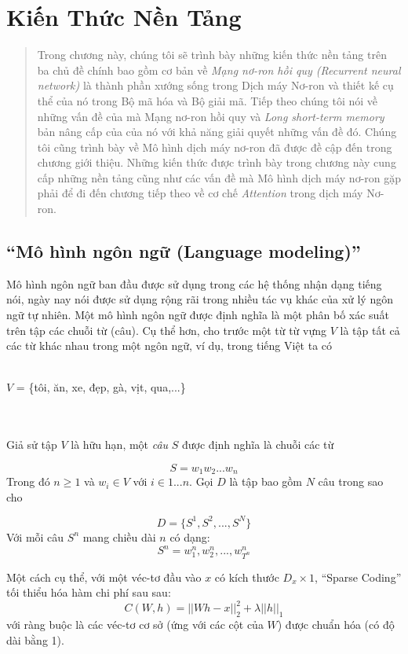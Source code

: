 \chapter{Kiến Thức Nền Tảng}
\ifpdf
    \graphicspath{{Chapter2/Chapter2Figs/PNG/}{Chapter2/Chapter2Figs/PDF/}{Chapter2/Chapter2Figs/}}
\else
    \graphicspath{{Chapter2/Chapter2Figs/EPS/}{Chapter2/Chapter2Figs/}}
\fi

\begin{quote}

Trong chương này, chúng tôi sẽ trình bày những kiến thức nền tảng trên ba chủ đề chính bao gồm cơ bản về \textit{Mạng nơ-ron hồi quy (Recurrent neural network)} là thành phần xướng sống trong Dịch máy Nơ-ron và thiết kế cụ thể của nó trong Bộ mã hóa và Bộ giải mã. Tiếp theo chúng tôi nói về những vấn đề của mà Mạng nơ-ron hồi quy và \textit{Long short-term memory} bản nâng cấp của của nó với khả năng giải quyết những vấn đề đó. Chúng tôi cũng trình bày về Mô hình dịch máy nơ-ron đã được đề cập đến trong chương giới thiệu. Những kiến thức được trình bày trong chương này cung cấp những nền tảng cũng như các vấn đề mà Mô hình dịch máy nơ-ron gặp phải để đi đến chương tiếp theo về cơ chế \textit{Attention} trong dịch máy Nơ-ron.

\end{quote}
\section{``Mô hình ngôn ngữ (Language modeling)''}
Mô hình ngôn ngữ ban đầu được sử dụng trong các hệ thống nhận dạng tiếng nói, ngày nay nói được sử dụng rộng rãi trong nhiều tác vụ khác của xử lý ngôn ngữ tự nhiên. Một mô hình ngôn ngữ được định nghĩa là một phân bố xác suất trên tập các chuỗi từ (câu). Cụ thể hơn, cho trước một từ từ vựng $V$ là tập tất cả các từ khác nhau trong một ngôn ngữ, ví dụ, trong tiếng Việt ta có\\\\
\centerline{$V$ = \{tôi, ăn, xe, đẹp, gà, vịt, qua,...\}}\\\\
Giả sử tập $V$ là hữu hạn, một \textit{câu} $S$ được định nghĩa là chuỗi các từ

$$S = w_1w_2...w_n$$
Trong đó $n \geq 1$ và $w_i \in V$ với $i \in {1...n}$. Gọi $D$ là tập bao gồm $N$ câu trong sao cho

$$D=\{S^1, S^2,...,S^N\}$$
Với mỗi câu $S^n$ mang chiều dài $n$ có dạng:
$$S^n=w^n_1, w^n_2,...,w^n_{T^n}$$

Một cách cụ thể, với một véc-tơ đầu vào $x$ có kích thước $D_x \times 1$, ``Sparse Coding'' tối thiểu hóa hàm chi phí sau sau:
\begin{equation} \label{eq_SparseCoding}
	C(W, h) = ||Wh - x||_2^2 + \lambda||h||_1
\end{equation}
với ràng buộc là các véc-tơ cơ sở (ứng với các cột của $W$) được chuẩn hóa (có độ dài bằng 1).

